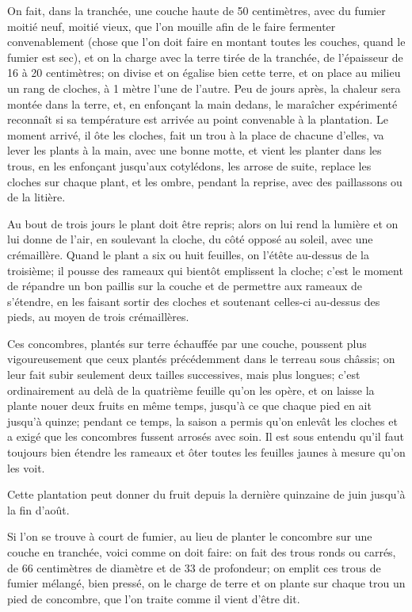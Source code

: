 \documentclass[10pt,a4paper]{book}
\begin{document}
On fait, dans la tranchée, une couche haute de 50 centimètres, avec du fumier moitié neuf, moitié vieux, que l'on mouille afin de le faire fermenter convenablement (chose que l'on doit faire en montant toutes les couches, quand le fumier est sec), et on la charge avec la terre tirée de la tranchée, de l'épaisseur de 16 à 20 centimètres; on divise et on égalise bien cette terre, et on place au milieu un rang de cloches, à 1 mètre l'une de l'autre. Peu de jours après, la chaleur sera montée dans la terre, et, en enfonçant la main dedans, le maraîcher expérimenté reconnaît si sa température est arrivée au point convenable à la plantation. Le moment arrivé, il ôte les cloches, fait un trou à la place de chacune d'elles, va lever les plants à la main, avec une bonne motte, et vient les planter dans les trous, en les enfonçant jusqu'aux cotylédons, les arrose de suite, replace les cloches sur chaque plant, et les ombre, pendant la reprise, avec des paillassons ou de la litière.

Au bout de trois jours le plant doit être repris; alors on lui rend la lumière et on lui donne de l'air, en soulevant la cloche, du côté opposé au soleil, avec une crémaillère. Quand le plant a six ou huit feuilles, on l'étête au-dessus de la troisième; il pousse des rameaux qui bientôt emplissent la cloche; c'est le moment de répandre un bon paillis sur la couche et de permettre aux rameaux de s'étendre, en les faisant sortir des cloches et soutenant celles-ci au-dessus des pieds, au moyen de trois crémaillères.

Ces concombres, plantés sur terre échauffée par une couche, poussent plus vigoureusement que ceux plantés précédemment dans le terreau sous châssis; on leur fait subir seulement deux tailles successives, mais plus longues; c'est ordinairement au delà de la quatrième feuille qu'on les opère, et on laisse la plante nouer deux fruits en même temps, jusqu'à ce que chaque pied en ait jusqu'à quinze; pendant ce temps, la saison a permis qu'on enlevât les cloches et a exigé que les concombres fussent arrosés avec soin. Il est sous entendu qu'il faut toujours bien étendre les rameaux et ôter toutes les feuilles jaunes à mesure qu'on les voit.

Cette plantation peut donner du fruit depuis la dernière quinzaine de juin jusqu'à la fin d'août.

Si l'on se trouve à court de fumier, au lieu de planter le concombre sur une couche en tranchée, voici comme on doit faire: on fait des trous ronds ou carrés, de 66 centimètres de diamètre et de 33 de profondeur; on emplit ces trous de fumier mélangé, bien pressé, on le charge de terre et on plante sur chaque trou un pied de concombre, que l'on traite comme il vient d'être dit.
\end{document}
